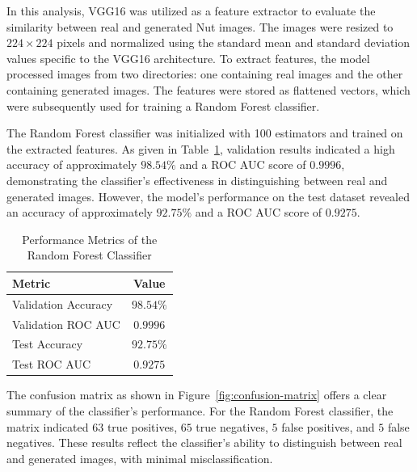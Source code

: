 \documentclass[12pt,DIV14,BCOR12mm,a4paper,footinclude=false,headinclude,parskip=half-,twoside,openright,cleardoublepage=empty,toc=index,bibliography=totoc,listof=totoc]{scrreprt}
\numberwithin{equation}{chapter}
\begin{document}
In this analysis, VGG16 was utilized as a feature extractor to evaluate the similarity between real and generated Nut images. The images were resized to \(224 \times 224\) pixels and normalized using the standard mean and standard deviation values specific to the VGG16 architecture. To extract features, the model processed images from two directories: one containing real images and the other containing generated images. The features were stored as flattened vectors, which were subsequently used for training a Random Forest classifier. 

The Random Forest classifier was initialized with 100 estimators and trained on the extracted features. As given in Table~\ref{tab:performance-metrics}, validation results indicated a high accuracy of approximately \(98.54\%\) and a ROC AUC score of \(0.9996\), demonstrating the classifier's effectiveness in distinguishing between real and generated images. However, the model's performance on the test dataset revealed an accuracy of approximately \(92.75\%\) and a ROC AUC score of \(0.9275\).

\begin{table} 
    \centering
    \caption{Performance Metrics of the Random Forest Classifier}
    \label{tab:performance-metrics}
    \begin{tabular}{lc} 
        \toprule
        \textbf{Metric} & \textbf{Value} \\ 
        \midrule
        Validation Accuracy & $98.54\%$ \\ 
        Validation ROC AUC & $0.9996$ \\ 
        Test Accuracy       & $92.75\%$ \\ 
        Test ROC AUC       & $0.9275$ \\ 
        \bottomrule
    \end{tabular}
\end{table}

The confusion matrix as shown in Figure~\ref{fig:confusion-matrix} offers a clear summary of the classifier's performance. For the Random Forest classifier, the matrix indicated \(63\) true positives, \(65\) true negatives, \(5\) false positives, and \(5\) false negatives. These results reflect the classifier's ability to distinguish between real and generated images, with minimal misclassification.
\end{document}
